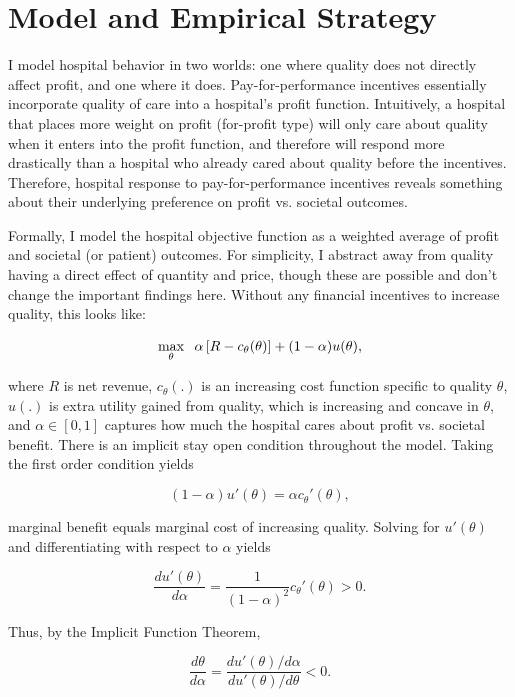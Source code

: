 \documentclass[12pt]{article}
\begin{document}
    \section{Model and Empirical Strategy}\label{sec:model}

    I model hospital behavior in two worlds: one where quality does not directly affect profit, and one where it does. Pay-for-performance incentives essentially incorporate quality of care into a hospital's profit function. Intuitively, a hospital that places more weight on profit (for-profit type) will only care about quality when it enters into the profit function, and therefore will respond more drastically than a hospital who already cared about quality before the incentives. Therefore, hospital response to pay-for-performance incentives reveals something about their underlying preference on profit vs. societal outcomes. 

    Formally, I model the hospital objective function as a weighted average of profit and societal (or patient) outcomes. For simplicity, I abstract away from quality having a direct effect of quantity and price, though these are possible and don't change the important findings here. Without any financial incentives to increase quality, this looks like:  
    
    $$\max_{\theta}\hspace{2mm}\alpha\left[R - c_{\theta}(\theta) \right] + (1-\alpha) u(\theta),$$

    \noindent where $R$ is net revenue, $c_{\theta}(.)$ is an increasing cost function specific to quality $\theta$, $u(.)$ is extra utility gained from quality, which is increasing and concave in $\theta$, and $\alpha\in[0,1]$ captures how much the hospital cares about profit vs. societal benefit. There is an implicit stay open condition throughout the model. Taking the first order condition yields 

    $$(1-\alpha)u'(\theta) = \alpha c_{\theta}'(\theta),$$

    \noindent marginal benefit equals marginal cost of increasing quality. Solving for $u'(\theta)$ and differentiating with respect to $\alpha$ yields

    $$\frac{du'(\theta)}{d\alpha} = \frac{1}{(1-\alpha)^2}c_{\theta}'(\theta) > 0.$$

    \noindent Thus, by the Implicit Function Theorem, 

    $$\frac{d\theta}{d\alpha} = \frac{du'(\theta)/d\alpha}{du'(\theta)/d\theta} < 0.$$
\end{document}
